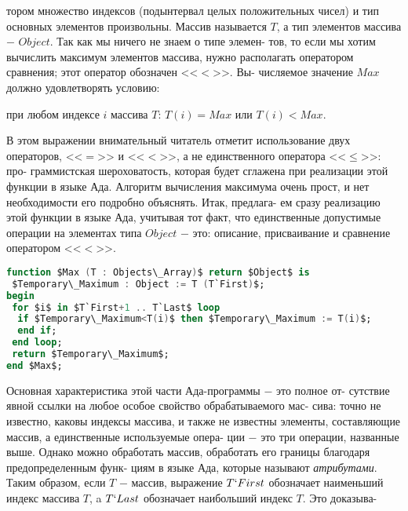 тором множество индексов (подынтервал целых положительных чисел)\linebreak
и тип основных элементов произвольны. Массив называется $T$, а тип\linebreak
элементов массива $-$ $Object$. Так как мы ничего не знаем о типе элемен-\linebreak
тов, то если мы хотим вычислить максимум элементов массива, нужно\linebreak
располагать оператором сравнения; этот оператор обозначен <<$<$>>. Вы-\linebreak
числяемое значение $Max$ должно удовлетворять условию:
\begin{center}
при любом индексе $i$ массива $T$: $T(i)=Max$ или $T(i)<Max$.
\end{center}
В этом  выражении  внимательный  читатель  отметит  использование\linebreak
двух операторов,  <<$=$>>  и  <<$<$>>,  а не единственного оператора <<$\leqslant$>>:  про-\linebreak
граммистская шероховатость, которая будет сглажена при реализации\linebreak
этой функции в языке Ада.  Алгоритм вычисления  максимума очень\linebreak
прост, и нет необходимости его подробно объяснять. Итак, предлага-\linebreak
ем сразу реализацию этой функции в языке Ада, учитывая тот факт,\linebreak
что единственные допустимые операции на элементах типа $Object$ $-$\linebreak
это: описание, присваивание и сравнение оператором <<$<$>>.
\begin{lstlisting}[mathescape=true, language=Ada, frame=none, xleftmargin=20pt]
function $Max (T : Objects\_Array)$ return $Object$ is
 $Temporary\_Maximum : Object := T (T`First)$;
begin
 for $i$ in $T`First+1 .. T`Last$ loop
  if $Temporary\_Maximum<T(i)$ then $Temporary\_Maximum := T(i)$;
  end if;
 end loop;
 return $Temporary\_Maximum$;
end $Max$;
\end{lstlisting}
Основная характеристика этой части Ада-программы $-$ это полное от-\linebreak
сутствие явной ссылки на любое особое свойство обрабатываемого мас-\linebreak
сива: точно не известно, каковы индексы массива, и также не известны\linebreak
элементы, составляющие массив, а единственные используемые опера-\linebreak
ции $-$ это три операции, названные выше. Однако можно обработать\linebreak
массив, обработать его границы благодаря предопределенным функ-\linebreak
циям в языке Ада, которые называют \textit{атрибутами}. Таким образом,\linebreak
если $T$ $-$ массив, выражение $T`First$ обозначает наименьший  индекс\linebreak
массива $T$, a $T`Last$ обозначает наибольший индекс $T$. Это доказыва-\linebreak
\newpage

